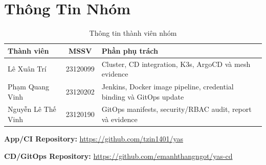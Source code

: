 \section{Thông Tin Nhóm}

\begin{table}[H]
\centering
\caption{Thông tin thành viên nhóm}
\begin{tabular}{|l|c|p{8.5cm}|}
\hline
\textbf{Thành viên} & \textbf{MSSV} & \textbf{Phần phụ trách} \\
\hline
Lê Xuân Trí & 23120099 & Cluster, CD integration, K3s, ArgoCD và mesh evidence \\
\hline
Phạm Quang Vinh & 23120202 & Jenkins, Docker image pipeline, credential binding và GitOps update \\
\hline
Nguyễn Lê Thế Vinh & 23120190 & GitOps manifests, security/RBAC audit, report và evidence \\
\hline
\end{tabular}
\end{table}

\textbf{App/CI Repository:} \url{https://github.com/tzin1401/yas}

\textbf{CD/GitOps Repository:} \url{https://github.com/emanhthangngot/yas-cd}
